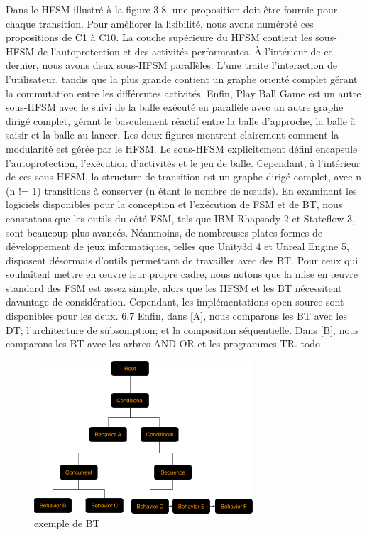 \documentclass[titlepage]{article}
\begin{document}
			Dans le HFSM illustré à la figure 3.8, une proposition doit être fournie pour chaque transition. Pour améliorer la lisibilité, nous avons numéroté ces propositions de C1 à C10. La couche supérieure du HFSM contient les sous-HFSM de l'autoprotection et des activités performantes. À l'intérieur de ce dernier, nous avons deux sous-HFSM parallèles. L’une traite l’interaction de l’utilisateur, tandis que la plus grande contient un graphe orienté complet gérant la commutation entre les différentes activités. Enfin, Play Ball Game est un autre sous-HFSM avec le suivi de la balle exécuté en parallèle avec un autre graphe dirigé complet, gérant le basculement réactif entre la balle d’approche, la balle à saisir et la balle au lancer.
			Les deux figures montrent clairement comment la modularité est gérée par le HFSM. Le sous-HFSM explicitement défini encapsule l'autoprotection, l'exécution d'activités et le jeu de balle. Cependant, à l'intérieur de ces sous-HFSM, la structure de transition est un graphe dirigé complet, avec n (n != 1) transitions à conserver (n étant le nombre de nœuds).
			En examinant les logiciels disponibles pour la conception et l'exécution de FSM et de BT, nous constatons que les outils du côté FSM, tels que IBM Rhapsody 2 et Stateflow 3, sont beaucoup plus avancés. Néanmoins, de nombreuses plates-formes de développement de jeux informatiques, telles que Unity3d 4 et Unreal Engine 5, disposent désormais d'outils permettant de travailler avec des BT. Pour ceux qui souhaitent mettre en œuvre leur propre cadre, nous notons que la mise en œuvre standard des FSM est assez simple, alors que les HFSM et les BT nécessitent davantage de considération. Cependant, les implémentations open source sont disponibles pour les deux. 6,7 Enfin, dans [A], nous comparons les BT avec les DT; l'architecture de subsomption; et la composition séquentielle. Dans [B], nous comparons les BT avec les arbres AND-OR et les programmes TR.
	todo
	\\
	\begin{figure}[h!]
		\includegraphics[width=\linewidth]{img/behavior_trees_example.png}
		\caption{exemple de BT \cite{rasmussen}}
		\label{fig:BT1}
	\end{figure}
	\\
\end{document}
